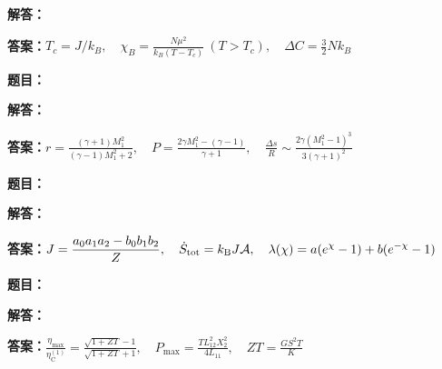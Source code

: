 \documentclass[lang=cn,color=blue,11pt]{elegantbook}
\begin{document}
\par\noindent\textbf{解答：}
\par\noindent\textbf{答案：}\(\displaystyle T_c=J/k_B,\quad\chi_B=\frac{N\mu^2}{k_B(T-T_c)}\ (T>T_c),\quad\Delta C=\frac32Nk_B\)\par
\par\smallskip\noindent\hrulefill\par\medskip
{}\par
\noindent\textbf{题目：}
\par\noindent\textbf{解答：}
\par\noindent\textbf{答案：}\(\displaystyle r=\frac{(\gamma+1)M_1^2}{(\gamma-1)M_1^2+2},\quad P=\frac{2\gamma M_1^2-(\gamma-1)}{\gamma+1},\quad\frac{\Delta s}{R}\sim\frac{2\gamma(M_1^2-1)^3}{3(\gamma+1)^2}\)\par
\par\smallskip\noindent\hrulefill\par\medskip
{}\par
\noindent\textbf{题目：}
\par\noindent\textbf{解答：}
\par\noindent\textbf{答案：}\(\displaystyle J=\frac{a_0a_1a_2-b_0b_1b_2}{Z},\quad\dot S_{\rm tot}=k_{\rm B}J\mathcal A,\quad\lambda(\chi)=a(e^\chi-1)+b(e^{-\chi}-1)\)\par
\par\smallskip\noindent\hrulefill\par\medskip
{}\par
\noindent\textbf{题目：}
\par\noindent\textbf{解答：}
\par\noindent\textbf{答案：}\(\displaystyle \frac{\eta_{\max}}{\eta_{\mathrm C}^{(1)}}=\frac{\sqrt{1+ZT}-1}{\sqrt{1+ZT}+1},\quad P_{\max}=\frac{TL_{12}^2X_2^2}{4L_{11}},\quad ZT=\frac{GS^2T}{K}\)\par
\par\smallskip\noindent\hrulefill\par\medskip
\end{document}
